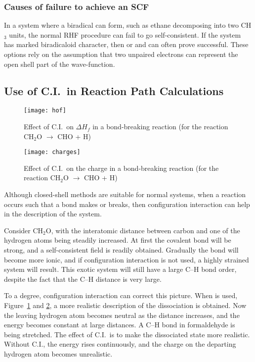 \subsubsection{Causes of failure to achieve an SCF}
In a system where a biradical can form, such as ethane  decomposing into  
two   CH$_3$  units,  the  normal  RHF  procedure  can  fail  to  go
self-consistent.  If the system has marked biradicaloid character,  then
  or  and  can often  prove
successful.  These options rely on the assumption that two unpaired  electrons 
can  represent  the open shell part of the wave-function.

\subsection{Use of C.I.\ in Reaction Path Calculations}
\begin{figure}
\begin{makeimage}
\end{makeimage}
\begin{center}
\texttt{[image: hof]}
\end{center}
\caption{\label{cich2o} Effect of C.I.\ on $\Delta H_f$ in a bond-breaking
reaction (for the reaction CH$_2$O $\rightarrow$ CHO + H)}
\end{figure}

\begin{figure}
\begin{makeimage}
\end{makeimage}
\begin{center}
\texttt{[image: charges]}
\end{center}
\caption{\label{cich2o2} Effect of C.I.\ on the charge  in a bond-breaking
reaction (for the reaction CH$_2$O $\rightarrow$ CHO + H)}
\end{figure}

Although closed-shell methods are suitable for normal systems, when a reaction
occurs such that a bond makes or breaks, then configuration interaction
can help in the description of the system.

Consider CH$_2$O,  with  the  interatomic  distance  between carbon and  one of
the hydrogen atoms being   steadily increased.    At   first  the  covalent 
bond  will  be  strong,  and  a self-consistent field is readily  obtained.  
Gradually  the  bond  will become  more  ionic,  and  if configuration
interaction is not used, a highly strained system will result.  This exotic
system will still have a large C--H bond order, despite the fact that the C--H
distance is very large.

To a degree,  configuration interaction can correct this picture. When
 is used, Figure~\ref{cich2o} and \ref{cich2o2}, a more realistic
description of the dissociation is obtained.  Now the  leaving hydrogen atom
becomes neutral as the distance increases, and the energy becomes constant at
large distances.   A C--H bond in formaldehyde is being stretched.  The effect
of C.I.\ is to make the dissociated state more realistic.  Without C.I., the
energy rises continuously, and the charge on the departing hydrogen atom
becomes unrealistic.
